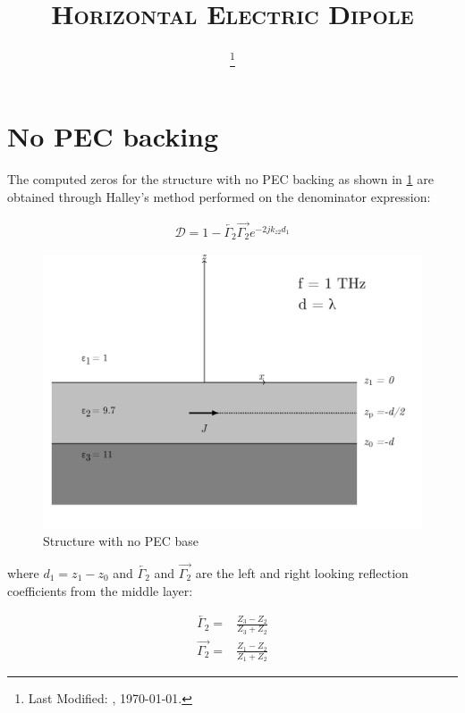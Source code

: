 \documentclass[11pt]{article}
\renewcommand{\^}{\hat}  %
\begin{document}
\title{\textsc{Horizontal Electric Dipole}\\}
\date{\footnote{Last Modified: \currenttime, \today.}}



\section{No PEC backing}

The computed zeros for the structure with no PEC backing as shown in \ref{fig:structure} are obtained through Halley's method performed on the denominator expression:

\begin{align}
  \mathcal D = 1 -\overleftarrow{\Gamma_2} \overrightarrow{\Gamma_2} e^{-2jk_{z2} d_{1}}
  \label{eq:D}
\end{align}

\begin{figure}[h!]
  \centering
  \includegraphics[width=.85\textwidth]{structure_with_no_PEC_Backing}
  \caption{Structure with no PEC base}
  \label{fig:structure}
\end{figure}

where $d_1 = z_1 - z_0$ and $\overleftarrow{\Gamma_2}$ and $\overrightarrow{\Gamma_2}$ are the left and right looking reflection coefficients from the middle layer:

\begin{subequations}
  \begin{align}
    \overleftarrow{\Gamma_2} ={}& \frac{{Z_3} - Z_2}{{Z_3} + Z_2}
    \label{eq:R_left}\\
    \overrightarrow{\Gamma_2} ={}& \frac{{Z_1} - Z_2}{{Z_1} + Z_2}
    \label{eq:R_right}
  \end{align}
  \label{eq:R}
\end{subequations}
\end{document}
